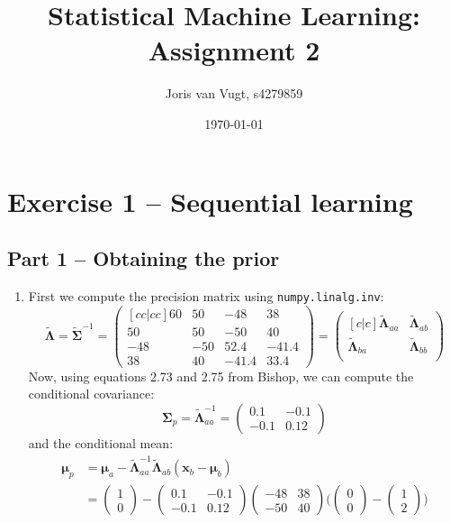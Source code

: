 \documentclass{article}
\title{Statistical Machine Learning: Assignment 2}
\date{\today}
\author{Joris van Vugt, s4279859}
\begin{document}
\maketitle
\section*{Exercise 1 -- Sequential learning}
\subsection*{Part 1 -- Obtaining the prior}
\begin{enumerate}
\item 
First we compute the precision matrix using \texttt{numpy.linalg.inv}:
$$
\tilde{\bm{\Lambda}} = \tilde{\bm{\Sigma}}^{-1} = 
\begin{pmatrix}[c c | c c]
60 & 50 & -48 & 38 \\
50 & 50 & -50 & 40 \\ \hline
-48 & -50 & 52.4 & -41.4 \\
38 & 40 & -41.4 & 33.4
\end{pmatrix} = 
\begin{pmatrix}[c | c]
\tilde{\bm{\Lambda}}_{aa} & \tilde{\bm{\Lambda}}_{ab} \\
\hline
\tilde{\bm{\Lambda}}_{ba} & \tilde{\bm{\Lambda}}_{bb} \\
\end{pmatrix}
$$
Now, using equations 2.73 and 2.75 from Bishop, we can compute the conditional covariance:
$$
\bm{\Sigma}_p = \tilde{\bm{\Lambda}}_{aa}^{-1} = 
\begin{pmatrix}
0.1 & -0.1 \\
-0.1 & 0.12
\end{pmatrix}
$$
and the conditional mean:
\begin{align*}
\bm{\mu}_p &= \bm{\mu}_a - \tilde{\bm{\Lambda}}_{aa}^{-1} \tilde{\bm{\Lambda}}_{ab}(\bm{x}_b - \bm{\mu}_b) \\
&= \begin{pmatrix}1 \\ 0 \end{pmatrix} - 
\begin{pmatrix}
0.1 & -0.1 \\
-0.1 & 0.12
\end{pmatrix}
\begin{pmatrix}
-48 & 38 \\
-50 & 40
\end{pmatrix}
\Bigg(\begin{pmatrix}0 \\ 0\end{pmatrix} - \begin{pmatrix}1 \\ 2\end{pmatrix}\Bigg) \\

\end{align*}
\end{enumerate}
\end{document}

